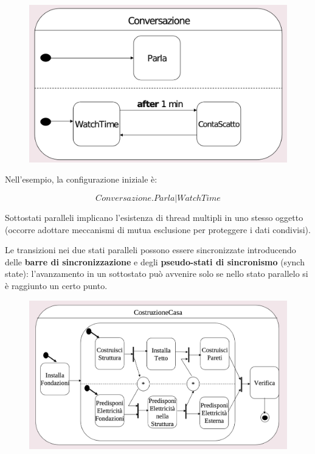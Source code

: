 \begin{figure}[H]
    \centering
    \includegraphics[width=0.75\linewidth]{assets/UML/state/state8.png}
\end{figure}

Nell'esempio, la configurazione iniziale è:

$$Conversazione.Parla|WatchTime$$ 

Sottostati paralleli implicano l'esistenza di thread multipli in uno stesso oggetto (occorre adottare meccanismi di mutua esclusione per proteggere i dati condivisi).

Le transizioni nei due stati paralleli possono essere sincronizzate introducendo delle \textbf{barre di sincronizzazione} e degli \textbf{pseudo-stati di sincronismo} (synch state): l'avanzamento in un sottostato può avvenire solo se nello stato parallelo si è raggiunto un certo punto.

\begin{figure}[H]
    \centering
    \includegraphics[width=0.75\linewidth]{assets/UML/state/state9.png}
\end{figure}

\newpage
